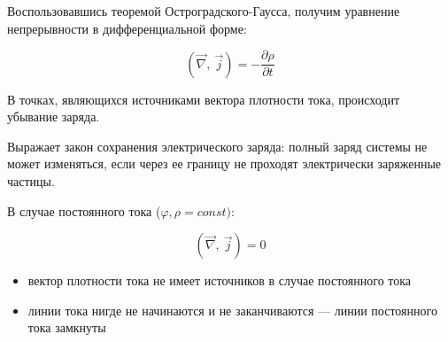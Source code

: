 Воспользовавшись теоремой Остроградского-Гаусса, получим уравнение непрерывности в дифференциальной форме:

$$
(\vec\nabla,\ \vec j)=-\frac{\partial\rho}{\partial t}
$$

В точках, являющихся источниками вектора плотности тока, происходит убывание заряда.

Выражает закон сохранения электрического заряда: полный заряд системы не может изменяться, если через 
ее границу не проходят электрически заряженные частицы.

В случае постоянного тока ($\varphi, \rho = const)$:

$$
(\vec\nabla,\ \vec j)=0
$$

\begin{itemize}
    \item вектор плотности тока не имеет источников в случае постоянного тока
    \item линии тока нигде не начинаются и не заканчиваются — линии постоянного тока замкнуты
\end{itemize}
